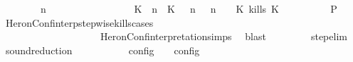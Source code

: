 \begin{isabellebody}
\ \ \ \ \ \ \ {\isacartoucheopen}{\isacharparenleft}{\isasymGamma}\ n\ {\isasymturnstile}\ {\isasymPsi}\ {\isasymtriangleright}\ {\isasymPhi}\ {\isacharequal}\isanewline
\ \ \ \ \ \ \ \ \ \ \ \ {\isacharparenleft}{\isacharparenleft}{\isacharparenleft}K\ {\isasymUp}\ n{\isacharparenright}\ {\isacharhash}\ {\isacharparenleft}K\ {\isasymnot}{\isasymUp}\ {\isasymge}\ n{\isacharparenright}\ {\isacharhash}\ {\isasymGamma}{\isacharparenright}{\isacharcomma}\ n\ {\isasymturnstile}\ {\isasymPsi}\ {\isasymtriangleright}\ {\isacharparenleft}{\isacharparenleft}K\ kills\ K\ {\isacharhash}\ {\isasymPhi}{\isacharparenright}{\isacharparenright}{\isacartoucheclose}\isanewline
\ \ \ \ \ \ \isamarkupfalse%
\ {\isacharquery}P\ \isamarkupfalse%
\ HeronConf{\isacharunderscore}interp{\isacharunderscore}stepwise{\isacharunderscore}kills{\isacharunderscore}cases\isanewline
\ \ \ \ \ \ \ \ \ \ \ \ \ \ \ \ \ \ \ \ HeronConf{\isacharunderscore}interpretation{\isachardot}simps\ \isamarkupfalse%
\ blast\isanewline
\ \ \ \ \isamarkupfalse%
\isanewline
\ \ \isamarkupfalse%
\isanewline
{}\isamarkupfalse%
%
\endisatagproof
{\isafoldproof}%
%
\isadelimproof
\isanewline
%
\endisadelimproof
\isanewline
{}\isamarkupfalse%
\ step{\isacharunderscore}elim{\isacharcolon}{\isacartoucheopen}{\isasymS}\ {\isasymhookrightarrow}\ {\isasymS}\isanewline
\isanewline
{}\isamarkupfalse%
\ sound{\isacharunderscore}reduction{\isacharprime}{\isacharcolon}\isanewline
\ \ \ {\isacartoucheopen}{\isasymS}\ {\isasymhookrightarrow}\ {\isasymS}\isanewline
\ \ \ {\isacartoucheopen}{\isasymlbrakk}\ {\isasymS}\ {\isasymrbrakk}\isactrlsub c\isactrlsub o\isactrlsub n\isactrlsub f\isactrlsub i\isactrlsub g\ {\isasymsupseteq}\ {\isasymlbrakk}\ {\isasymS}\ {\isasymrbrakk}\isactrlsub c\isactrlsub o\isactrlsub n\isactrlsub f\isactrlsub i\isactrlsub g{\isacartoucheclose}\isanewline
%
\isadelimproof
%
\endisadelimproof
%
\isatagproof
{}\isamarkupfalse%
\ {\isacharminus}\isanewline

\end{isabellebody}
